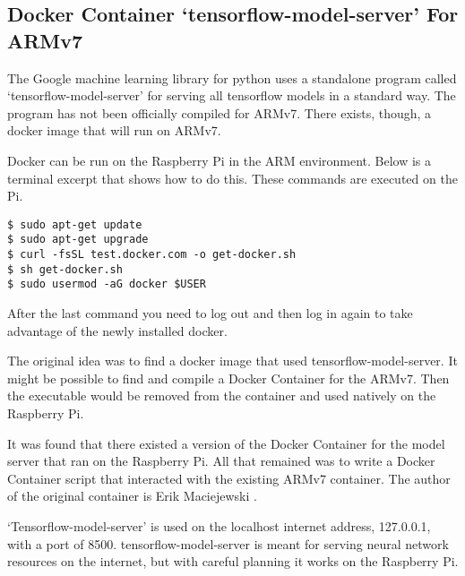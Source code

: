 \subsection{Docker Container `tensorflow-model-server' For ARMv7}
The Google machine learning library for python uses a standalone program called `tensorflow-model-server' for serving all tensorflow models in a standard way. The program has not been officially compiled for ARMv7. There exists, though, a docker image that will run on ARMv7.

Docker can be run on the Raspberry Pi in the ARM environment. Below is a terminal excerpt that shows how to do this. These commands are executed on the Pi.

\begin{verbatim}
$ sudo apt-get update
$ sudo apt-get upgrade
$ curl -fsSL test.docker.com -o get-docker.sh 
$ sh get-docker.sh
$ sudo usermod -aG docker $USER
\end{verbatim}

After the last command you need to log out and then log in again to take advantage of the newly installed docker.

The original idea was to find a docker image that used tensorflow-model-server. It might be possible to find and compile a Docker Container for the ARMv7. Then the executable would be removed from the container and used natively on the Raspberry Pi. 

It was found that there existed a version of the Docker Container for the model server that ran on the Raspberry Pi. All that remained was to write a Docker Container script that interacted with the existing ARMv7 container. The author of the original container is Erik Maciejewski \cite{2020Maciejewski}.

`Tensorflow-model-server' is used on the localhost internet address, 127.0.0.1, with a port of 8500. tensorflow-model-server is meant for serving neural network resources on the internet, but with careful planning it works on the Raspberry Pi.

